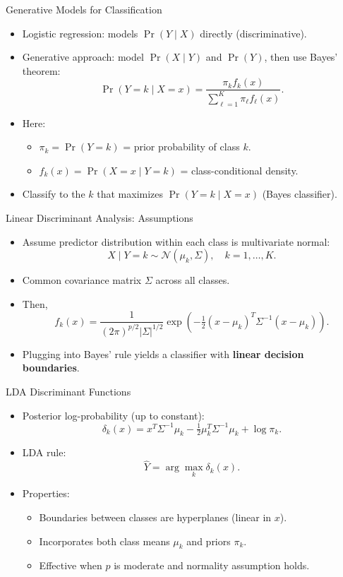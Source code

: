 \documentclass[../../main.tex]{subfiles}
\begin{document}
\begin{frame}{Generative Models for Classification}
\begin{itemize}
    \item Logistic regression: models $\Pr(Y \mid X)$ directly (discriminative).  
    \item Generative approach: model $\Pr(X \mid Y)$ and $\Pr(Y)$, then use Bayes’ theorem:  
    \[
    \Pr(Y=k \mid X=x) = \frac{\pi_k f_k(x)}{\sum_{\ell=1}^K \pi_\ell f_\ell(x)}.
    \]
    \item Here:
    \begin{itemize}
        \item $\pi_k = \Pr(Y=k)$ = prior probability of class $k$.  
        \item $f_k(x) = \Pr(X=x \mid Y=k)$ = class-conditional density.  
    \end{itemize}
    \item Classify to the $k$ that maximizes $\Pr(Y=k \mid X=x)$ (Bayes classifier).  
\end{itemize}
\end{frame}

\begin{frame}{Linear Discriminant Analysis: Assumptions}
\begin{itemize}
    \item Assume predictor distribution within each class is multivariate normal:
    \[
    X \mid Y=k \sim \mathcal{N}(\mu_k, \Sigma), \quad k=1,\dots,K.
    \]
    \item Common covariance matrix $\Sigma$ across all classes.  
    \item Then,
    \[
    f_k(x) = \frac{1}{(2\pi)^{p/2}|\Sigma|^{1/2}}
    \exp\!\left(-\tfrac{1}{2}(x-\mu_k)^T \Sigma^{-1}(x-\mu_k)\right).
    \]
    \item Plugging into Bayes’ rule yields a classifier with \textbf{linear decision boundaries}.
\end{itemize}
\end{frame}

\begin{frame}{LDA Discriminant Functions}
\begin{itemize}
    \item Posterior log-probability (up to constant):
    \[
    \delta_k(x) = x^T \Sigma^{-1}\mu_k - \tfrac{1}{2}\mu_k^T \Sigma^{-1}\mu_k + \log \pi_k.
    \]
    \item LDA rule:
    \[
    \hat{Y} = \arg\max_k \delta_k(x).
    \]
    \item Properties:
    \begin{itemize}
        \item Boundaries between classes are hyperplanes (linear in $x$).  
        \item Incorporates both class means $\mu_k$ and priors $\pi_k$.  
        \item Effective when $p$ is moderate and normality assumption holds.  
    \end{itemize}
\end{itemize}
\end{frame}
\end{document}
